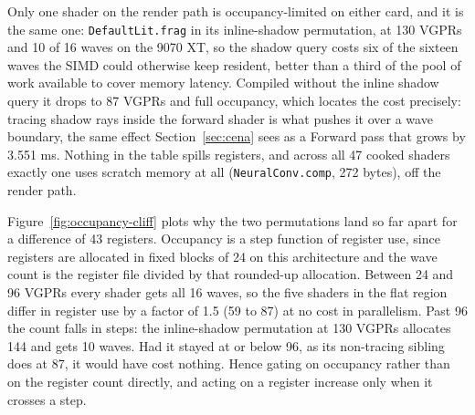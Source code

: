 \begin{table}[tbp]
\caption[Shader registers and theoretical occupancy]{Registers and theoretical occupancy of the key shaders on both GPUs. For AMD: VGPR count and
the largest possible number of wave32 waves per SIMD (1536 VGPRs, granularity 24, at most 16). For
NVIDIA: registers per thread and the largest number of warps per SM (65536 registers, at most 48).
Both figures are derived from the register count rather than measured with a profiler.
Generated from the committed baselines by \texttt{tools/gen\_shader\_tables.py}.}
\label{tab:occupancy}
\centering

\end{table}

Only one shader on the render path is occupancy-limited on either card, and it is the same one:
\texttt{DefaultLit.frag} in its inline-shadow permutation, at 130 VGPRs and 10 of 16 waves on the
9070 XT, so the shadow query costs six of the sixteen waves the SIMD could otherwise keep resident,
better than a third of the pool of work available to cover memory latency. Compiled without the
inline shadow query it drops to 87 VGPRs and full occupancy, which
locates the cost precisely: tracing shadow rays inside the forward shader is what pushes it over a
wave boundary, the same effect Section~\ref{sec:cena} sees as a Forward pass that grows by 3.551 ms.
Nothing in the table spills registers, and across all 47 cooked shaders exactly one uses scratch
memory at all (\texttt{NeuralConv.comp}, 272 bytes), off the render path.

Figure~\ref{fig:occupancy-cliff} plots why the two permutations land so far apart for a difference of
43 registers. Occupancy is a step function of register use, since registers are allocated in fixed
blocks of 24 on this architecture and the wave count is the register file divided by that rounded-up
allocation. Between 24 and 96 VGPRs every shader gets all 16 waves, so the five shaders in the flat
region differ in register use by a factor of 1.5 (59 to 87) at no cost in parallelism. Past 96 the
count falls in steps: the inline-shadow permutation at 130 VGPRs allocates 144 and gets 10 waves. Had
it stayed at or below 96, as its non-tracing sibling does at 87, it would have cost nothing. Hence gating
on occupancy rather than on the register count directly, and acting on a register increase only when
it crosses a step.

